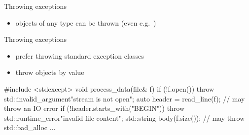 \begin{frame}[fragile]
  \begin{block}{Throwing exceptions}
    \begin{itemize}
      \item objects of any type can be thrown (even e.g.\ )
    \end{itemize}
  \end{block}
  \begin{goodpractice}{Throwing exceptions}
    \begin{itemize}
      \item prefer throwing standard exception classes
      \item throw objects by value
    \end{itemize}
  \end{goodpractice}
  \small
  \begin{cppcode}
    #include <stdexcept>
    void process_data(file& f) {
      if (!f.open())
        throw std::invalid_argument{"stream is not open"};
      auto header = read_line(f); // may throw an IO error
      if (!header.starts_with("BEGIN"))
        throw std::runtime_error{"invalid file content"};
      std::string body(f.size()); // may throw std::bad_alloc
      ...
    }
  \end{cppcode}
\end{frame}

